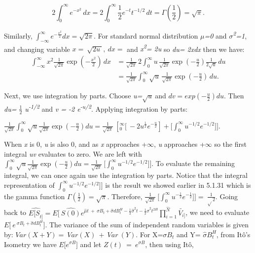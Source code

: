 \documentclass[12pt,a4paper]{report}
\numberwithin{equation}{section}
\begin{document}
\begin{equation}
2\int_{0}^{\infty} e^{-x^{2}}\,dx
= 2\int_{0}^{\infty}\frac{1}{2}e^{-t}t^{-1/2}\,dt
= \Gamma\!\left(\frac{1}{2}\right)
= \sqrt{\pi}.
\tag{5.1.31}\label{eq:5.1.31}
\end{equation}

Similarly,
\(\int_{- \infty}^{\infty}{e^{- \frac{x^{2}}{2}}dx = \sqrt{2\pi}}\). For
standard normal distribution \emph{$\mu$=0} and
\emph{$\sigma$\textsuperscript{2}=1}, and changing variable
\(x = \ \sqrt{2u\ },\ dx =\) and \emph{x\textsuperscript{2}= 2u} so
\emph{du= 2xdx} then we have:
\[
\begin{aligned}
\int_{-\infty}^{\infty} x^{2}\frac{1}{\sqrt{2\pi}}\exp\!\left(-\frac{x^{2}}{2}\right)\,dx
&= \frac{1}{\sqrt{2\pi}}\,2\int_{0}^{\infty}
u\,\frac{1}{\sqrt{2\pi}}\exp\!\left(-\frac{u}{2}\right)\frac{1}{2\sqrt{u}}\,du \\
&= \frac{1}{\sqrt{2\pi}}\int_{0}^{\infty}
\sqrt{u}\,\frac{1}{\sqrt{2\pi}}\exp\!\left(-\frac{u}{2}\right)\,du .
\end{aligned}
\]

Next, we use integration by parts. Choose \emph{u=}\(\sqrt{u}\ \)and
\({dv = exp}\left( - \frac{u}{2} \right)du\). Then \emph{du= $\frac{1}{2}$
u\textsuperscript{-1/2}} and \emph{v = -2 e\textsuperscript{-u/2}}.
Applying integration by parts:

\(\frac{1}{\sqrt{2\pi}}\int_{0}^{\infty}{\sqrt{u}\frac{1}{\sqrt{2\pi}}\exp\left( - \frac{u}{2} \right)du = \frac{1}{\sqrt{2\pi}}\ \left\lbrack_{0}^{\infty}\lbrack\  - 2u^{\frac{1}{2}}e^{- \frac{u}{2}} \right\rbrack + \lbrack\int_{0}^{\infty}{u^{- 1/2}e^{- 1/2}\rbrack\rbrack}}\).

When \emph{x} is 0, \emph{u} is also 0, and as \emph{x} approaches +$\infty$,
\emph{u} approaches +$\infty$ so the first integral \emph{uv} evaluates to
zero. We are left with
\(\int_{0}^{\infty}{\sqrt{u}\frac{1}{\sqrt{2\pi}}\exp\left( - \frac{u}{2} \right)du = \frac{1}{\sqrt{2\pi}}\ \lbrack\int_{0}^{\infty}{u^{- 1/2}e^{- 1/2}\rbrack\rbrack}}\).
To evaluate the remaining integral, we can once again use the
integration by parts. Notice that the integral representation of
\(\int_{0}^{\infty}{u^{- 1/2}e^{- 1/2}\rbrack\rbrack}\) is the result we
showed earlier in 5.1.31 which is the gamma function
\(\Gamma\left( \frac{1}{2} \right) = \sqrt{\pi}\). Therefore,
\(\frac{1}{\sqrt{2\pi}}\ \lbrack\int_{0}^{\infty}{u^{- \frac{1}{2}}e^{- \frac{1}{2}}\rbrack\rbrack} = \ \frac{1}{\sqrt{}2}\).
Going back to
\(\widehat{{E\lbrack S}_{t\rbrack}} = E\lbrack\ \widehat{S(0)}e^{\widehat{\mu}t\  + \ \sigma B_{t} + \widehat{\sigma}dB_{t}^{H} - \frac{1}{2}{\widehat{\sigma}}^{2}t - \frac{1}{2}{\widehat{\sigma}}^{2}t^{2H}}\prod_{i = 1}^{\widehat{N}}\widetilde{V_{i\rbrack}}\),
we need to evaluate
\(E\lbrack\ e^{\ \sigma B_{t} + \widehat{\sigma}dB_{t}^{H}}\rbrack\).
The variance of the sum of independent random variables is given by:
\(Var(X + Y) = \ Var(X)\  + \ Var\ (Y).\) For X=\(\sigma B_{t}\) and Y=
\(\widehat{\sigma}B_{t}^{H}\), from Itô's Isometry we have
\(E\lbrack e^{\sigma B}\rbrack\) and let \(Z(t)\  = \ e^{\sigma B}\),
then using Itô,
\end{document}
